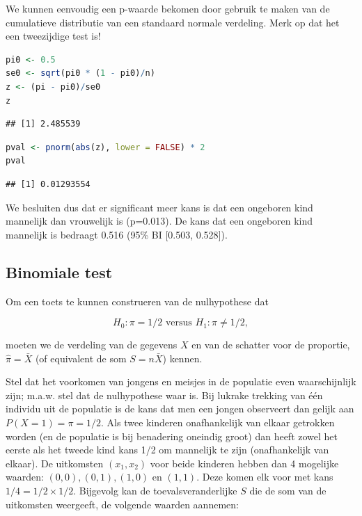 \documentclass[
  12pt,dutch,coursenotes]{book}
\theoremstyle{definition}
\theoremstyle{definition}
\theoremstyle{definition}
\theoremstyle{definition}
\theoremstyle{remark}
\begin{document}
We kunnen eenvoudig een p-waarde bekomen door gebruik te maken van de cumulatieve distributie van een standaard normale verdeling. Merk op dat het een tweezijdige test is!

\begin{lstlisting}[language=R]
pi0 <- 0.5
se0 <- sqrt(pi0 * (1 - pi0)/n)
z <- (pi - pi0)/se0
z
\end{lstlisting}

\begin{lstlisting}
## [1] 2.485539
\end{lstlisting}

\begin{lstlisting}[language=R]
pval <- pnorm(abs(z), lower = FALSE) * 2
pval
\end{lstlisting}

\begin{lstlisting}
## [1] 0.01293554
\end{lstlisting}

We besluiten dus dat er significant meer kans is dat een ongeboren kind mannelijk dan vrouwelijk is (p=0.013). De kans dat een ongeboren kind mannelijk is bedraagt 0.516 (95\% BI {[}0.503, 0.528{]}).

\hypertarget{subsec:binom}{%
\subsection{Binomiale test}\label{subsec:binom}}

Om een toets te kunnen construeren van de nulhypothese
dat

\[H_0: \pi=1/2 \text{ versus } H_1: \pi\neq 1/2,\]

moeten we de verdeling van de
gegevens \(X\) en van de schatter voor de proportie, \(\hat \pi = \bar X\) (of equivalent de som \(S=n\bar X\)) kennen.

Stel dat het voorkomen van jongens en meisjes in de populatie even waarschijnlijk zijn; m.a.w. stel dat de nulhypothese waar is. Bij lukrake trekking
van één individu uit de populatie is de kans dat men een jongen observeert dan gelijk aan \(P(X=1) = \pi = 1/2.\)
Als twee kinderen onafhankelijk van elkaar getrokken worden (en de populatie is bij benadering oneindig groot) dan heeft zowel
het eerste als het tweede kind kans 1/2 om mannelijk te zijn
(onafhankelijk van elkaar). De uitkomsten \((x_1, x_2)\) voor beide kinderen
hebben dan 4 mogelijke waarden: \((0,0), (0,1),(1,0)\) en \((1,1).\) Deze komen
elk voor met kans \(1/4 = 1/2 \times 1/2\). Bijgevolg kan de
toevalsveranderlijke \(S\) die de som van de uitkomsten weergeeft, de
volgende waarden aannemen:
\end{document}
